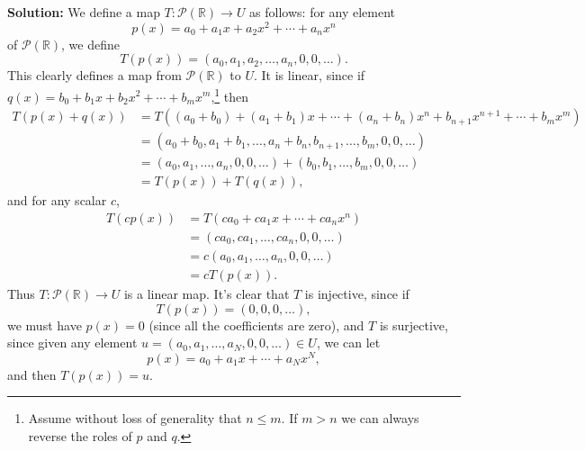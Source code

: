 \documentclass[letterpaper,12pt]{article}
\newcommand{\R}{\mathbb{R}}
\renewcommand{\P}{\mathcal{P}}
\begin{document}
\begin{enumerate}
{\bf Solution:} We define a map $T:\P(\R)\to U$ as follows: for any element
\[
 p(x) = a_0+a_1x+a_2x^2+\cdots + a_nx^n
\]
of $\P(\R)$, we define
\[
 T(p(x)) = (a_0,a_1,a_2,\ldots, a_n,0,0,\ldots).
\]
This clearly defines a map from $\P(\R)$ to $U$. It is linear, since if $q(x) = b_0+b_1x+b_2x^2+\cdots + b_mx^m$,\footnote{Assume without loss of generality that $n\leq m$. If $m>n$ we can always reverse the roles of $p$ and $q$.} then
\begin{align*}
 T(p(x)+q(x)) & = T((a_0+b_0)+(a_1+b_1)x+\cdots + (a_n+b_n)x^n + b_{n+1}x^{n+1}+\cdots + b_mx^m)\\
& = (a_0+b_0,a_1+b_1,\ldots, a_n+b_n, b_{n+1},\ldots, b_m,0,0,\ldots)\\
& = (a_0,a_1,\ldots, a_n,0,0,\ldots)+(b_0,b_1,\ldots, b_m,0,0,\ldots)\\
& = T(p(x))+T(q(x)),
\end{align*}
and for any scalar $c$,
\begin{align*}
 T(cp(x)) & = T(ca_0+ca_1x+\cdots + ca_nx^n)\\
& = (ca_0,ca_1,\ldots, ca_n,0,0,\ldots)\\
& = c(a_0,a_1,\ldots, a_n,0,0,\ldots)\\
& = cT(p(x)).
\end{align*}
Thus $T:\P(\R)\to U$ is a linear map. It's clear that $T$ is injective, since if
\[
 T(p(x)) = (0,0,0,\ldots),
\]
we must have $p(x) = 0$ (since all the coefficients are zero), and $T$ is surjective, since given any element $u=(a_0,a_1,\ldots, a_N,0,0,\ldots)\in U$, we can let 
\[
 p(x) = a_0+a_1x+\cdots + a_Nx^N,
\]
and then $T(p(x)) = u$.
 \end{enumerate}
\end{document}
